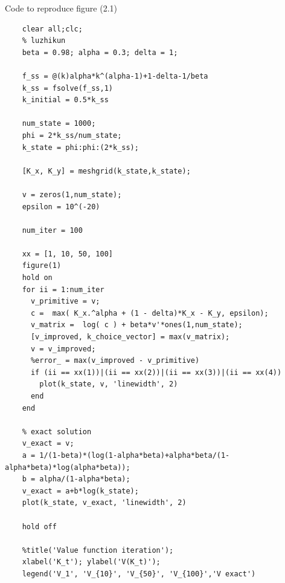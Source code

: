 \documentclass[twoside]{article}
\begin{document}
Code to reproduce figure (2.1)
\begin{lstlisting}
    clear all;clc;
    % luzhikun
    beta = 0.98; alpha = 0.3; delta = 1;

    f_ss = @(k)alpha*k^(alpha-1)+1-delta-1/beta
    k_ss = fsolve(f_ss,1)
    k_initial = 0.5*k_ss

    num_state = 1000;
    phi = 2*k_ss/num_state;
    k_state = phi:phi:(2*k_ss);

    [K_x, K_y] = meshgrid(k_state,k_state);

    v = zeros(1,num_state);
    epsilon = 10^(-20)

    num_iter = 100

    xx = [1, 10, 50, 100]
    figure(1)
    hold on 
    for ii = 1:num_iter
      v_primitive = v;
      c =  max( K_x.^alpha + (1 - delta)*K_x - K_y, epsilon);
      v_matrix =  log( c ) + beta*v'*ones(1,num_state);
      [v_improved, k_choice_vector] = max(v_matrix);
      v = v_improved;
      %error_ = max(v_improved - v_primitive)
      if (ii == xx(1))|(ii == xx(2))|(ii == xx(3))|(ii == xx(4))
        plot(k_state, v, 'linewidth', 2)
      end
    end

    % exact solution
    v_exact = v;
    a = 1/(1-beta)*(log(1-alpha*beta)+alpha*beta/(1-alpha*beta)*log(alpha*beta));
    b = alpha/(1-alpha*beta);
    v_exact = a+b*log(k_state);
    plot(k_state, v_exact, 'linewidth', 2)

    hold off

    %title('Value function iteration'); 
    xlabel('K_t'); ylabel('V(K_t)');
    legend('V_1', 'V_{10}', 'V_{50}', 'V_{100}','V exact')
\end{lstlisting}
\end{document}
